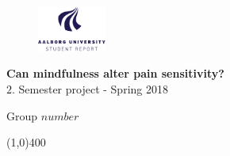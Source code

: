 \clearpage
\thispagestyle{empty}

\begin{figure}[H]
	\raggedleft
	\includegraphics[width=0.2\textwidth]{setup/aau_logo_en.pdf}
\end{figure} 

\vspace{5 cm}

\begin{center}	
	\begin{Huge}
		\textbf{Can mindfulness alter pain sensitivity?}\\
		\vspace{5 mm}
		$2.$ Semester project - Spring 2018\\
		\vspace{3 mm}
	\end{Huge}
	{\Large Group $number$}
\end{center}
\vspace*{\fill}

\begin{center}
	\line(1,0){400}
\end{center}




